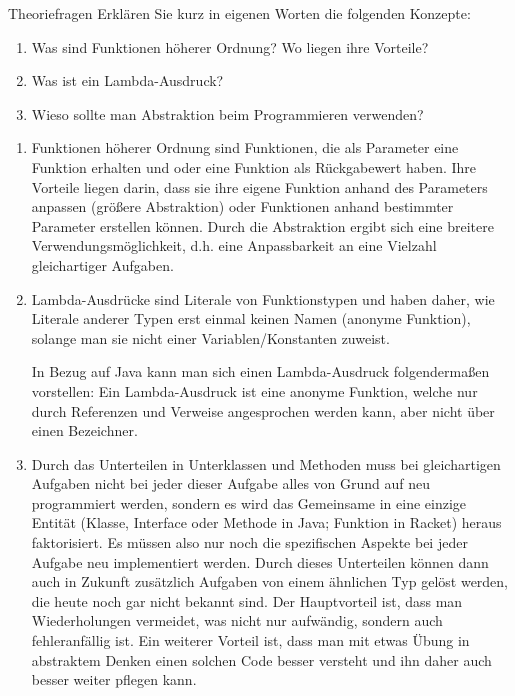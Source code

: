 \documentclass{../tuda-exercise}
\begin{document}
  \maketitle

  \begin{task}[credit=\stars{0}{3}]{Theoriefragen}
    Erklären Sie kurz in eigenen Worten die folgenden Konzepte:

    \begin{enumerate}
      \item Was sind Funktionen höherer Ordnung? Wo liegen ihre Vorteile?
      \item Was ist ein Lambda-Ausdruck?
      \item Wieso sollte man Abstraktion beim Programmieren verwenden?
    \end{enumerate}

    \begin{solution}
      \begin{enumerate}
        \item Funktionen höherer Ordnung sind Funktionen, die als Parameter eine Funktion
        erhalten und oder eine Funktion als Rückgabewert haben. Ihre Vorteile liegen darin, dass
        sie ihre eigene Funktion anhand des Parameters anpassen (größere Abstraktion) oder
        Funktionen anhand bestimmter Parameter erstellen können. Durch die Abstraktion ergibt
        sich eine breitere Verwendungsmöglichkeit, d.h. eine Anpassbarkeit an eine Vielzahl
        gleichartiger Aufgaben.
        \item Lambda-Ausdrücke sind Literale von Funktionstypen und haben daher, wie Literale
        anderer Typen erst einmal keinen Namen (anonyme Funktion), solange man sie nicht einer
        Variablen/Konstanten zuweist.

        \br

        In Bezug auf Java kann man sich einen Lambda-Ausdruck folgendermaßen vorstellen: Ein
        Lambda-Ausdruck ist eine anonyme Funktion, welche nur durch Referenzen und Verweise
        angesprochen werden kann, aber nicht über einen Bezeichner.
        \item Durch das Unterteilen in Unterklassen und Methoden muss bei gleichartigen Aufgaben
        nicht bei jeder dieser Aufgabe alles von Grund auf neu programmiert werden, sondern es
        wird das Gemeinsame in eine einzige Entität (Klasse, Interface oder Methode in Java;
        Funktion in Racket) heraus faktorisiert. Es müssen also nur noch die spezifischen Aspekte
        bei jeder Aufgabe neu implementiert werden. Durch dieses Unterteilen können dann auch in
        Zukunft zusätzlich Aufgaben von einem ähnlichen Typ gelöst werden, die heute noch gar nicht
        bekannt sind. Der Hauptvorteil ist, dass man Wiederholungen vermeidet, was nicht nur
        aufwändig, sondern auch fehleranfällig ist. Ein weiterer Vorteil ist, dass man mit etwas
        Übung in abstraktem Denken einen solchen Code besser versteht und ihn daher auch besser
        weiter pflegen kann.
      \end{enumerate}
    \end{solution}
  \end{task}
\end{document}
